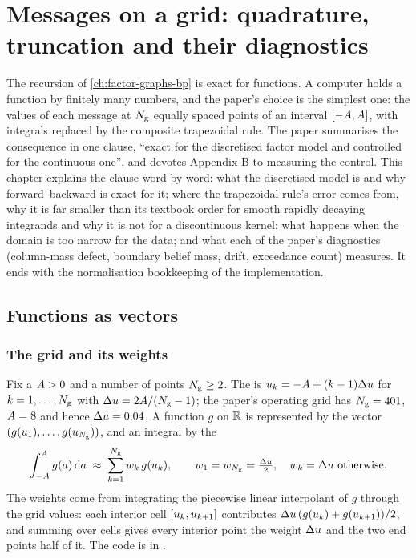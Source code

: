 \chapter{Messages on a grid: quadrature, truncation and their diagnostics}
\label{ch:grid-quadrature}

The recursion of \cref{ch:factor-graphs-bp} is exact for functions. A computer holds a
function by finitely many numbers, and the paper's choice is the simplest one: the
values of each message at $N_{\mathrm{g}}$ equally spaced points of an interval
$[-A,A]$, with integrals replaced by the composite trapezoidal rule.
The paper summarises the consequence in one clause, ``exact for the discretised factor
model and controlled for the continuous one'', and devotes Appendix B to measuring the
control. This chapter explains the clause word by word: what the discretised model is
and why forward--backward is exact for it; where the trapezoidal rule's error comes
from, why it is far smaller than its textbook order for smooth rapidly decaying
integrands and why it is not for a discontinuous kernel; what happens when the domain
is too narrow for the data; and what each of the paper's diagnostics (column-mass
defect, boundary belief mass, drift, exceedance count) measures. It ends with the
normalisation bookkeeping of the implementation.

\section{Functions as vectors}

\subsection{The grid and its weights}

Fix a  $A>0$ and a number of points $N_{\mathrm{g}}\ge2$. The
 is $u_{k}=-A+(k-1)\Delta u$ for $k=1,\dots,N_{\mathrm{g}}$ with
 $\Delta u=2A/(N_{\mathrm{g}}-1)$; the paper's operating grid has
$N_{\mathrm{g}}=401$, $A=8$ and hence $\Delta u=0.04$. A function $g$ on $\mathbb{R}$ is
represented by the vector $(g(u_{1}),\dots,g(u_{N_{\mathrm{g}}}))$, and an integral
by the 
\begin{equation}
  \int_{-\halfwidth}^{\halfwidth}g(a)\dd a\;\approx\;\sum_{k=1}^{\ngrid}w_k\,g(\gridpt{k}),
  \qquad w_1=w_{\ngrid}=\tfrac{\gridh}{2},\quad w_k=\gridh\ \text{otherwise}.
  \label{eq:gq-trap}
\end{equation}
The weights come from integrating the piecewise linear interpolant of $g$ through the
grid values: each interior cell $[u_{k},u_{k+1}]$ contributes
$\Delta u\,(g(u_{k})+g(u_{k+1}))/2$, and summing over cells gives every interior
point the weight $\Delta u$ and the two end points half of it. The code is
 in .

